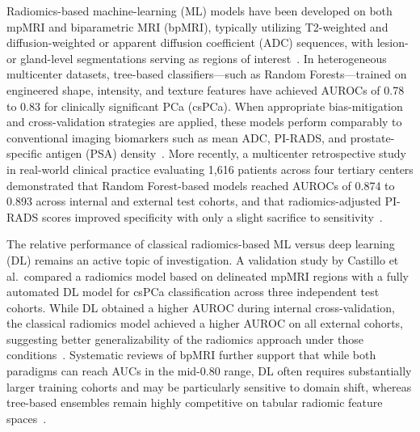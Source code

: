 \documentclass[11pt]{article}
\begin{document}
Radiomics-based machine-learning (ML) models have been developed on both mpMRI and biparametric MRI (bpMRI), typically utilizing T2-weighted and diffusion-weighted or apparent diffusion coefficient (ADC) sequences, with lesion- or gland-level segmentations serving as regions of interest~\citep{QIMS2022PerformanceVar,Diagnostics2022BpMRIReview}. In heterogeneous multicenter datasets, tree-based classifiers—such as Random Forests—trained on engineered shape, intensity, and texture features have achieved AUROCs of 0.78 to 0.83 for clinically significant PCa (csPCa). When appropriate bias-mitigation and cross-validation strategies are applied, these models perform comparably to conventional imaging biomarkers such as mean ADC, PI-RADS, and prostate-specific antigen (PSA) density~\citep{QIMS2022PerformanceVar,Diagnostics2022BpMRIReview}. More recently, a multicenter retrospective study in real-world clinical practice evaluating 1{,}616 patients across four tertiary centers demonstrated that Random Forest-based models reached AUROCs of 0.874 to 0.893 across internal and external test cohorts, and that radiomics-adjusted PI-RADS scores improved specificity with only a slight sacrifice to sensitivity~\citep{Bao2024}.

The relative performance of classical radiomics-based ML versus deep learning (DL) remains an active topic of investigation. A validation study by Castillo et al.\ compared a radiomics model based on delineated mpMRI regions with a fully automated DL model for csPCa classification across three independent test cohorts. While DL obtained a higher AUROC during internal cross-validation, the classical radiomics model achieved a higher AUROC on all external cohorts, suggesting better generalizability of the radiomics approach under those conditions~\citep{Castillo2022Cancers}. Systematic reviews of bpMRI further support that while both paradigms can reach AUCs in the mid-0.80 range, DL often requires substantially larger training cohorts and may be particularly sensitive to domain shift, whereas tree-based ensembles remain highly competitive on tabular radiomic feature spaces~\citep{Diagnostics2022BpMRIReview,castillo2020automated}.
\end{document}
